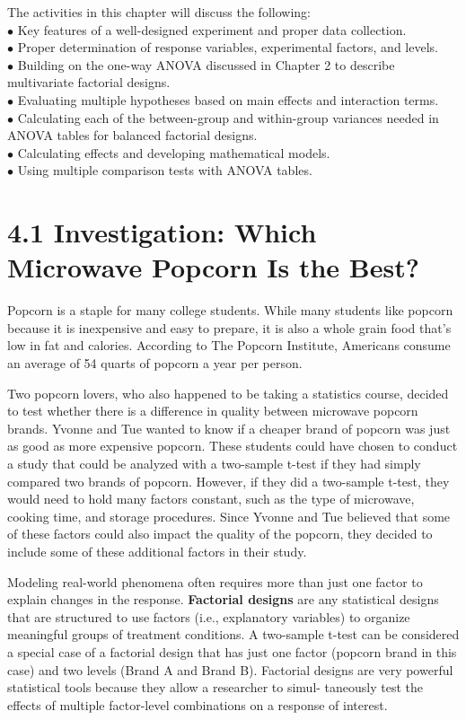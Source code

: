 \documentclass[
]{report}
\theoremstyle{definition}
\theoremstyle{definition}
\theoremstyle{definition}
\theoremstyle{definition}
\theoremstyle{remark}
\begin{document}
The activities in this chapter will discuss the following:\\
\(\bullet\) Key features of a well-designed experiment and proper data collection.\\
\(\bullet\) Proper determination of response variables, experimental factors, and levels.\\
\(\bullet\) Building on the one-way ANOVA discussed in Chapter 2 to describe multivariate factorial designs.\\
\(\bullet\) Evaluating multiple hypotheses based on main effects and interaction terms.\\
\(\bullet\) Calculating each of the between-group and within-group variances needed in ANOVA tables for balanced factorial designs.\\
\(\bullet\) Calculating effects and developing mathematical models.\\
\(\bullet\) Using multiple comparison tests with ANOVA tables.

\hypertarget{investigation-which-microwave-popcorn-is-the-best}{%
\chapter{4.1 Investigation: Which Microwave Popcorn Is the Best?}\label{investigation-which-microwave-popcorn-is-the-best}}

Popcorn is a staple for many college students. While many students like popcorn because it is inexpensive
and easy to prepare, it is also a whole grain food that's low in fat and calories. According to The Popcorn
Institute, Americans consume an average of 54 quarts of popcorn a year per person.

Two popcorn lovers, who also happened to be taking a statistics course, decided to test whether there is a
difference in quality between microwave popcorn brands. Yvonne and Tue wanted to know if a cheaper brand
of popcorn was just as good as more expensive popcorn. These students could have chosen to conduct a study
that could be analyzed with a two-sample t-test if they had simply compared two brands of popcorn. However,
if they did a two-sample t-test, they would need to hold many factors constant, such as the type of microwave,
cooking time, and storage procedures. Since Yvonne and Tue believed that some of these factors could also
impact the quality of the popcorn, they decided to include some of these additional factors in their study.

Modeling real-world phenomena often requires more than just one factor to explain changes in the
response. \textbf{Factorial designs} are any statistical designs that are structured to use factors (i.e., explanatory
variables) to organize meaningful groups of treatment conditions. A two-sample t-test can be considered a
special case of a factorial design that has just one factor (popcorn brand in this case) and two levels (Brand A
and Brand B). Factorial designs are very powerful statistical tools because they allow a researcher to simul-
taneously test the effects of multiple factor-level combinations on a response of interest.
\end{document}

